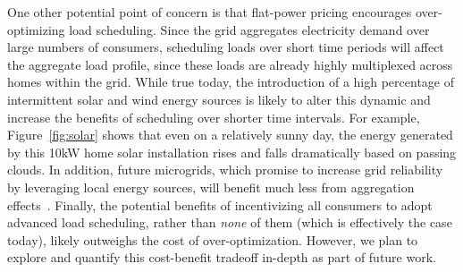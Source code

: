 One other potential point of concern is that flat-power pricing encourages over-optimizing load scheduling.  Since the grid aggregates electricity demand over large numbers of consumers, scheduling loads over short time periods will affect the aggregate load profile, since these loads are already highly multiplexed across homes within the grid.   While true today, the introduction of a high percentage of intermittent solar and wind energy sources is likely to alter this dynamic and increase the benefits of scheduling over shorter time intervals.  For example, Figure~\ref{fig:solar} shows that even on a relatively sunny day, the energy generated by this 10kW home solar installation rises and falls dramatically based on passing clouds. In addition, future microgrids, which promise to increase grid reliability by leveraging local energy sources, will benefit much less from aggregation effects~\cite{iccps}.  Finally, the potential benefits of incentivizing all consumers to adopt advanced load scheduling, rather than \emph{none} of them (which is effectively the case today), likely outweighs the cost of over-optimization.  However, we plan to explore and quantify this cost-benefit tradeoff in-depth as part of future work.

























